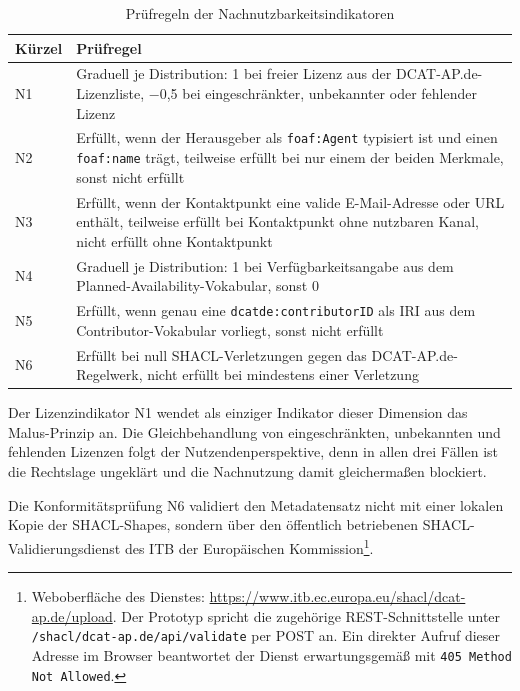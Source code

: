 \begin{table}[H]
\centering
\scriptsize
\renewcommand{\arraystretch}{1.2}
\begin{tabular}{p{} >{\raggedright\arraybackslash}p{}}
\hline
\textbf{Kürzel} & \textbf{Prüfregel} \\
\hline
N1 & Graduell je Distribution: 1 bei freier Lizenz aus der DCAT-AP.de-Lizenzliste, $-$0,5 bei eingeschränkter, unbekannter oder fehlender Lizenz \\
\hline
N2 & Erfüllt, wenn der Herausgeber als \texttt{foaf:Agent} typisiert ist und einen \texttt{foaf:name} trägt, teilweise erfüllt bei nur einem der beiden Merkmale, sonst nicht erfüllt \\
\hline
N3 & Erfüllt, wenn der Kontaktpunkt eine valide E-Mail-Adresse oder URL enthält, teilweise erfüllt bei Kontaktpunkt ohne nutzbaren Kanal, nicht erfüllt ohne Kontaktpunkt \\
\hline
N4 & Graduell je Distribution: 1 bei Verfügbarkeitsangabe aus dem Planned-Availability-Vokabular, sonst 0 \\
\hline
N5 & Erfüllt, wenn genau eine \texttt{dcatde:contributorID} als \acrfull{IRI} aus dem Contributor-Vokabular vorliegt, sonst nicht erfüllt \\
\hline
N6 & Erfüllt bei null SHACL-Verletzungen gegen das DCAT-AP.de-Regelwerk, nicht erfüllt bei mindestens einer Verletzung \\
\hline
\end{tabular}
\caption{Prüfregeln der Nachnutzbarkeitsindikatoren}
\label{tab:impl_reusability}
\end{table}

Der Lizenzindikator N1 wendet als einziger Indikator dieser Dimension das Malus-Prinzip an. Die Gleichbehandlung von eingeschränkten, unbekannten und fehlenden Lizenzen folgt der Nutzendenperspektive, denn in allen drei Fällen ist die Rechtslage ungeklärt und die Nachnutzung damit gleichermaßen blockiert.

Die Konformitätsprüfung N6 validiert den Metadatensatz nicht mit einer lokalen Kopie der SHACL-Shapes, sondern über den öffentlich betriebenen SHACL-Validierungsdienst des \acrfull{ITB} der Europäischen Kommission\footnote{Weboberfläche des Dienstes: \url{https://www.itb.ec.europa.eu/shacl/dcat-ap.de/upload}. Der Prototyp spricht die zugehörige \acrfull{REST}-Schnittstelle unter \texttt{/shacl/dcat-ap.de/api/validate} per POST an. Ein direkter Aufruf dieser Adresse im Browser beantwortet der Dienst erwartungsgemäß mit \texttt{405 Method Not Allowed}.}. 

